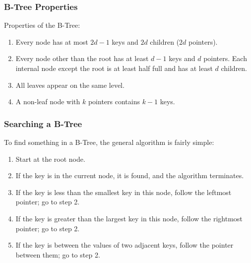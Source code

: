 \begin{frame}
\frametitle{B-Tree Properties}

Properties of the B-Tree:

\begin{enumerate}
	\item Every node has at most $2d-1$ keys and $2d$ children ($2d$ pointers).
	\item Every node other than the root has at least $d-1$ keys and $d$ pointers. Each internal node except the root is at least half full and has at least $d$ children.
	\item All leaves appear on the same level.
	\item A non-leaf node with $k$ pointers contains $k-1$ keys.
\end{enumerate}

\end{frame}

\begin{frame}
\frametitle{Searching a B-Tree}

To find something in a B-Tree, the general algorithm is fairly simple:

\begin{enumerate}
	\item Start at the root node. 
	\item If the key is in the current node, it is found, and the algorithm terminates.
	\item If the key is less than the smallest key in this node, follow the leftmost pointer; go to step 2.
	\item If the key is greater than the largest key in this node, follow the rightmost pointer; go to step 2.
	\item If the key is between the values of two adjacent keys, follow the pointer between them; go to step 2.
\end{enumerate}



\end{frame}

